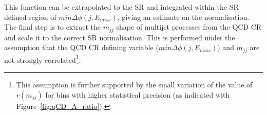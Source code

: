 \hspace{10pt} This function can be extrapolated to the SR and integrated within the SR defined region of $min\Delta\phi(j, E_{miss})$, giving an estimate on the normalisation. The final step is to extract the $m_{jj}$ shape of multijet processes from the QCD CR and scale it to the correct SR normalisation. This is performed under the assumption that the QCD CR defining variable ($min\Delta\phi(j, E_{miss})$) and $m_{jj}$ are not strongly correlated\footnote{This assumption is further supported by the small variation of the value of $r(m_{jj})$ for bins with higher statistical precision (as indicated with Figure~\ref{fig:qCD_A_ratio}).}.




